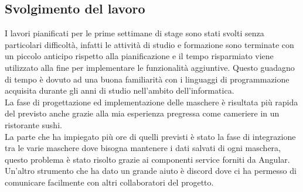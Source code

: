 \subsection{Svolgimento del lavoro}
I lavori pianificati per le prime settimane di stage sono stati svolti senza particolari difficoltà, infatti le attività di studio e formazione sono terminate con un piccolo anticipo rispetto alla pianificazione e il tempo risparmiato viene utilizzato alla fine per implementare le funzionalità aggiuntive. Questo guadagno di tempo è dovuto ad una buona familiarità con i linguaggi di programmazione acquisita durante gli anni di studio nell'ambito dell'informatica.\\
La fase di progettazione ed implementazione delle maschere è risultata più rapida del previsto anche grazie alla mia esperienza pregressa come cameriere in un ristorante sushi.\\
La parte che ha impiegato più ore di quelli previsti è stato la fase di integrazione tra le varie maschere dove bisogna mantenere i dati salvati di ogni maschera, questo problema è stato risolto grazie ai componenti service forniti da Angular. Un'altro strumento che ha dato un grande aiuto è discord dove ci ha permesso di comunicare facilmente con altri collaboratori del progetto.\\
